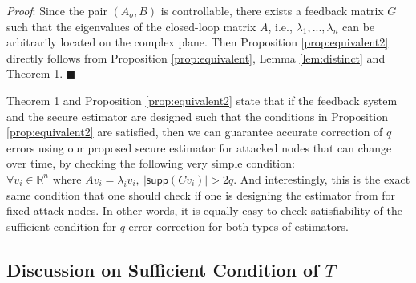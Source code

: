 \documentclass[../../thesis.tex]{subfiles}
\begin{document}
\textit{Proof}:
Since the pair $(A_o,B)$ is controllable, there exists a feedback matrix $G$ such that the eigenvalues of the closed-loop matrix $A$, i.e., $\lambda_1, ..., \lambda_n$ can be arbitrarily located on the complex plane. Then Proposition \ref{prop:equivalent2} directly follows from Proposition \ref{prop:equivalent}, Lemma \ref{lem:distinct} and Theorem 1. \hfill$\blacksquare$


Theorem 1 and Proposition \ref{prop:equivalent2} state that if the feedback system and the secure estimator are designed such that the conditions in Proposition \ref{prop:equivalent2} are satisfied, then we can guarantee accurate correction of $q$ errors using our proposed secure estimator for attacked nodes that can change over time, by checking the following very simple condition:
$ %
\forall v_i \in \mathbb{R}^n \text{ where } Av_i =\lambda_i v_i, ~ \lvert \textsf{supp}(Cv_i) \rvert > 2q.  \nonumber
$ %
And interestingly, this is the exact same condition that one should check if one is designing the estimator from \cite{Fawzi:2014} for fixed attack nodes. In other words, it is equally easy to check satisfiability of the sufficient condition for $q$-error-correction for both types of estimators.

\subsection{Discussion on Sufficient Condition of $T$}
\end{document}
